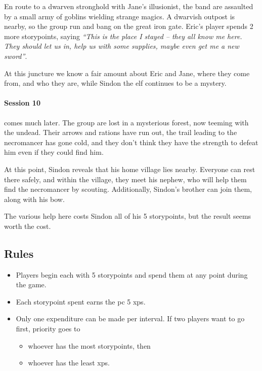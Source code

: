 \begin{multicols}{2}
En route to a dwarven stronghold with Jane's illusionist, the band are assaulted by a small army of goblins wielding strange magics.
A dwarvish outpost is nearby, so the group run and bang on the great iron gate.  Eric's player spends 2 more \glspl{storypoint}, saying \textit{``This is the place I stayed -- they all know me here.
They should let us in, help us with some supplies, maybe even get me a new sword''}.

At this juncture we know a fair amount about Eric and Jane, where they come from, and who they are, while Sindon the elf continues to be a mystery.

\paragraph{Session 10} comes much later.
The group are lost in a mysterious forest, now teeming with the undead.
Their arrows and rations have run out, the trail leading to the necromancer has gone cold, and they don't think they have the strength to defeat him even if they could find him.

At this point, Sindon reveals that his home village lies nearby.
Everyone can rest there safely, and within the village, they meet his nephew, who will help them find the necromancer by scouting.
Additionally, Sindon's brother can join them, along with his bow.

The various help here costs Sindon all of his 5 \glspl{storypoint}, but the result seems worth the cost.

\subsection{ Rules}

\begin{itemize}
  \item
  Players begin each with 5 \glspl{storypoint} and spend them at any point during the game.
  \item
  Each \gls{storypoint} spent earns the \gls{pc} 5 \glspl{xp}.
  \item
  Only one expenditure can be made per \gls{interval}.
  If two players want to go first, priority goes to
  \begin{itemize}
    \item
    whoever has the most \glspl{storypoint}, then
    \item
    whoever has the least \glspl{xp}.
  \end{itemize}
\end{itemize}


\end{multicols}
